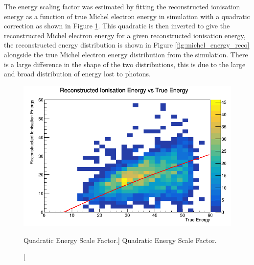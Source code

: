 The energy scaling factor was estimated by fitting the reconstructed ionisation
energy as a function of true Michel electron energy in \protodune{} simulation
with a quadratic correction as shown in Figure \ref{fig:quadratic_fit}. This 
quadratic is then inverted to give the reconstructed Michel electron energy for 
a given reconstructed ionisation energy, the reconstructed energy distribution
is shown in Figure \ref{fig:michel_energy_reco} alongside the true Michel
electron energy distribution from the simulation. There is a large difference in
the shape of the two distributions, this is due to the large and broad
distribution of energy lost to photons.

\begin{figure}
	\centering
	\includegraphics[width=\textwidth]{figures/reco_v_true.png}
	\caption
	[Quadratic Energy Scale Factor.]
	{Quadratic Energy Scale Factor.}
	\label{fig:quadratic_fit}
\end{figure}


